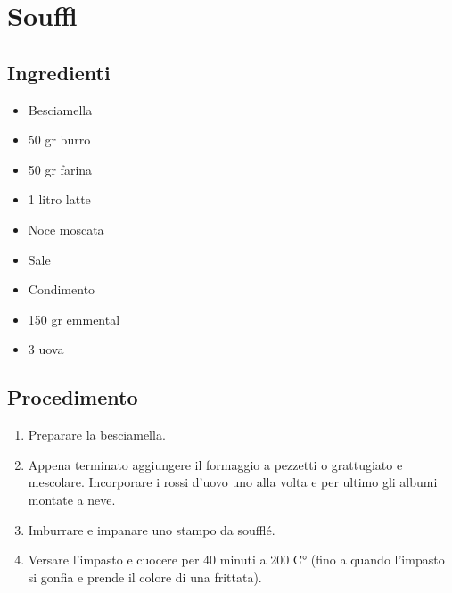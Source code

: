 \section{Souffl}
\subsection{Ingredienti}
\begin{itemize}
\item Besciamella  
\item 50 gr burro  
\item 50 gr farina  
\item 1 litro latte  
\item Noce moscata  
\item Sale  
\item Condimento  
\item 150 gr emmental   
\item 3 uova
\end{itemize}
\subsection{Procedimento}
\begin{enumerate}
\item  Preparare la besciamella.   
\item  Appena terminato aggiungere il formaggio a pezzetti o grattugiato e mescolare. Incorporare i rossi d'uovo uno alla volta e per ultimo gli albumi montate a neve.  
\item  Imburrare e impanare uno stampo da soufflé.  
\item  Versare l'impasto e cuocere per 40 minuti a 200 C° (fino a quando l'impasto si gonfia e prende il colore di una frittata).
\end{enumerate}
